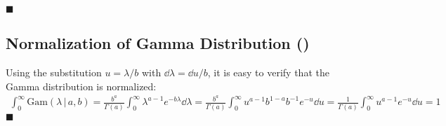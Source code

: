 \documentclass[11pt, a4paper]{scrartcl}
\newcommand{\given}{\,\vert\,}
\newcommand{\eot}{\hfill\(\blacksquare\)}
\newcommand{\diffstar}{\texorpdfstring{\raisebox{-1pt}{\resizebox{!}{8pt}{\(\star\)}}}{*}}
\newcommand{\onestar}  {(\diffstar)}
\begin{document}
			\eot

		\subsection{Normalization of Gamma Distribution  \onestar}
			Using the substitution \( u = \lambda/b \) with \( \dd \lambda = \dd u / b \), it is easy to verify that the Gamma distribution is normalized:
			\begin{align}
				\int_{0}^{\infty}\! \mathrm{Gam}(\lambda \given a, b)
					= \frac{b^a}{\Gamma(a)} \int_{0}^{\infty}\! \lambda^{a - 1} e^{-b\lambda} \dd{\lambda}
					= \frac{b^a}{\Gamma(a)} \int_{0}^{\infty}\! u^{a - 1} b^{1 - a}b^{-1}  e^{-u} \dd{u}
					= \frac{1}{\Gamma(a)} \int_{0}^{\infty}\! u^{a - 1} e^{-u} \dd{u}
					= 1
			\end{align}
			\eot
\end{document}
